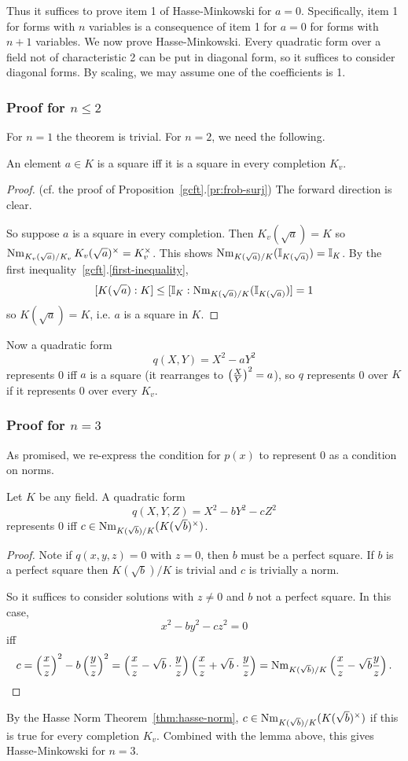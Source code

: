 Thus it suffices to prove item 1 of Hasse-Minkowski for $a=0$. Specifically, item 1 for forms with $n$ variables is a consequence of item 1 for $a=0$ for forms with $n+1$ variables.
We now prove Hasse-Minkowski. Every quadratic form over a field not of characteristic 2 can be put in diagonal form, so it suffices to consider diagonal forms. By scaling, we may assume one of the coefficients is 1.
\subsubsection{Proof for $n\le 2$}
For $n=1$ the theorem is trivial. For $n=2$, we need the following.
\begin{lem}
An element $a\in K$ is a square iff it is a square in every completion $K_v$.
\end{lem}
\begin{proof} (cf. the proof of Proposition~\ref{gcft}.\ref{pr:frob-surj}) 
The forward direction is clear. 

So suppose $a$ is a square in every completion. 
Then $K_v(\sqrt{a})=K$ so $\operatorname{Nm}_{K_v(\sqrt{a})/K_v}K_v(\sqrt{a})^{\times} =K_v^{\times}$. 
This shows $\operatorname{Nm}_{K(\sqrt{a})/K}(\mathbb{I}_{K(\sqrt{a})})=\mathbb{I}_K$. By the first inequality~\ref{gcft}.\ref{first-inequality},
\[
[K(\sqrt{a}):K]\le [\mathbb{I}_K:\operatorname{Nm}_{K(\sqrt{a})/K}(\mathbb{I}_{K(\sqrt{a})})]=1
\]
so $K(\sqrt{a})=K$, i.e. $a$ is a square in $K$.
\end{proof}
Now a quadratic form
\[
q(X,Y)=X^2-aY^2
\]
represents 0 iff $a$ is a square (it rearranges to $\left( {\frac{X}{Y}} \right)^2=a$), so $q$ represents 0 over $K$ if it represents 0 over every $K_v$.
\subsubsection{Proof for $n=3$}
As promised, we re-express the condition for $p(x)$ to represent 0 as a condition on norms.
\begin{lem}
Let $K$ be any field. A quadratic form 
\[
q(X,Y,Z)=X^2-bY^2-cZ^2
\]
represents 0 iff $c\in \operatorname{Nm}_{K(\sqrt b)/K}(K(\sqrt b)^{\times})$.
\end{lem}
\begin{proof}
Note if $q(x,y,z)=0$ with $z=0$, then $b$ must be a perfect square. If $b$ is a perfect square then $K(\sqrt b)/K$ is trivial and $c$ is trivially a norm.

So it suffices to consider solutions with $z\ne 0$ and $b$ not a perfect square.
In this case,
\[
x^2-by^2-cz^2=0\]
iff
\[ c=\left( {\frac{x}{z}} \right) ^2 -b\left( {\frac{y}{z}} \right)^2=\left( {\frac{x}{z}-\sqrt b\cdot \frac{y}{z}} \right)\left( {\frac{x}{z}+\sqrt b\cdot\frac{y}{z}} \right)=\operatorname{Nm}_{K(\sqrt b)/K}\left( {\frac{x}{z}-\sqrt b\frac{y}{z}} \right).
\]
\end{proof}
By the Hasse Norm Theorem~\ref{thm:hasse-norm}, $c\in \operatorname{Nm}_{K(\sqrt b)/K}(K(\sqrt b)^{\times})$ if this is true for every completion $K_v$. Combined with the lemma above, this gives Hasse-Minkowski for $n=3$.

